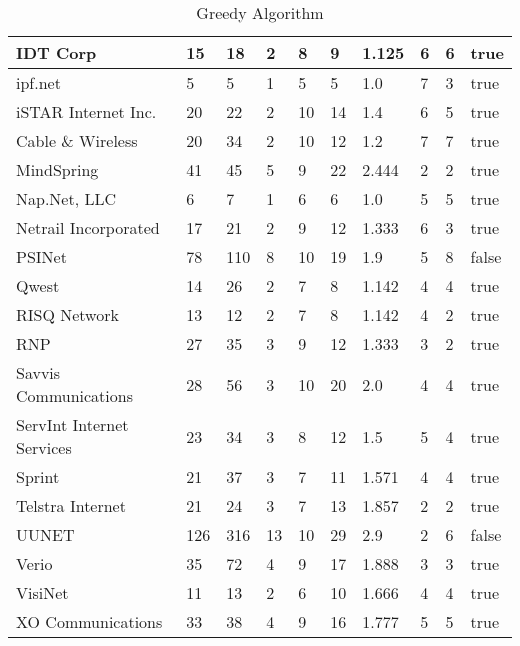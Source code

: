 \documentclass [12pt]{article}
\begin{document}
\begin{table}[H]
\begin{tabular}{ | l | l | l | l | l | l | l | l | l | l | }
    IDT Corp & 15 & 18 & 2 & 8 & 9 & 1.125 & 6 & 6 & true\\ \hline
    ipf.net & 5 & 5 & 1 & 5 & 5 & 1.0 & 7 & 3 & true\\ \hline
    iSTAR Internet Inc. & 20 & 22 & 2 & 10 & 14 & 1.4 & 6 & 5 & true\\ \hline
    Cable \& Wireless & 20 & 34 & 2 & 10 & 12 & 1.2 & 7 & 7 & true\\ \hline
    MindSpring & 41 & 45 & 5 & 9 & 22 & 2.444 & 2 & 2 & true\\ \hline
    Nap.Net, LLC & 6 & 7 & 1 & 6 & 6 & 1.0 & 5 & 5 & true\\ \hline
    Netrail Incorporated & 17 & 21 & 2 & 9 & 12 & 1.333 & 6 & 3 & true\\ \hline
    PSINet & 78 & 110 & 8 & 10 & 19 & 1.9 & 5 & 8 & false\\ \hline
    Qwest & 14 & 26 & 2 & 7 & 8 & 1.142 & 4 & 4 & true\\ \hline
    RISQ Network & 13 & 12 & 2 & 7 & 8 & 1.142 & 4 & 2 & true\\ \hline
    RNP & 27 & 35 & 3 & 9 & 12 & 1.333 & 3 & 2 & true\\ \hline
    Savvis Communications & 28 & 56 & 3 & 10 & 20 & 2.0 & 4 & 4 & true\\ \hline
    ServInt Internet Services & 23 & 34 & 3 & 8 & 12 & 1.5 & 5 & 4 & true\\ \hline
    Sprint & 21 & 37 & 3 & 7 & 11 & 1.571 & 4 & 4 & true\\ \hline
    Telstra Internet & 21 & 24 & 3 & 7 & 13 & 1.857 & 2 & 2 & true\\ \hline
    UUNET & 126 & 316 & 13 & 10 & 29 & 2.9 & 2 & 6 & false\\ \hline
    Verio & 35 & 72 & 4 & 9 & 17 & 1.888 & 3 & 3 & true\\ \hline
    VisiNet & 11 & 13 & 2 & 6 & 10 & 1.666 & 4 & 4 & true\\ \hline
    XO Communications & 33 & 38 & 4 & 9 & 16 & 1.777 & 5 & 5 & true\\ \hline
 \end{tabular}
 \caption{Greedy Algorithm}
 \label{table:greedyloc}
 \end{table}
  
\end{document}

